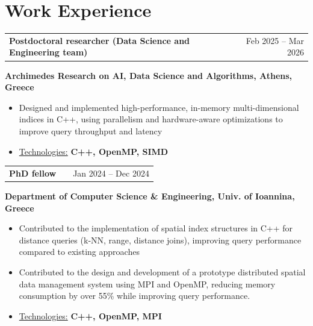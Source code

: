 \documentclass[a4paper,10pt]{article}
\makeatletter
\newenvironment{job}[2]
{
	\begin{tabularx}{\linewidth}{@{}l X r@{}}
		\small
		\textbf{#1} & \hfill &  #2 \\[3.75pt]
	\end{tabularx}
	\footnotesize
	\setlength{\parskip}{3pt} %
	\setlength{\parindent}{0pt} %
}
{
}
\makeatother
\begin{document}
\vspace{-1.2\baselineskip}
\section{Work Experience}

\begin{job} {Postdoctoral researcher (Data Science and Engineering team)}{Feb 2025 – Mar 2026}	
\textbf{Archimedes Research on AI, Data Science and Algorithms, Athens, Greece} 

\begin{itemize}

\item Designed and implemented high-performance, in-memory multi-dimensional indices in C++, using parallelism and hardware-aware optimizations to improve query throughput and latency

\item \underline{Technologies:} \textbf{C++, OpenMP, SIMD}
\end{itemize}

\end{job}


\begin{job}{PhD fellow }{Jan 2024 – Dec 2024}
	\textbf{Department of Computer Science \& Engineering, Univ. of Ioannina, Greece}
	\begin{itemize}
		
		
		
		\item Contributed to the implementation of spatial index structures in C++ for distance queries (k‑NN, range, distance joins), improving query performance compared to existing approaches
		
		
		\item Contributed to the design and development of a prototype distributed spatial data management system using MPI and OpenMP, reducing memory consumption by over 55\% while improving query performance.
		
		\item \underline{Technologies:} \textbf{C++, OpenMP, MPI}
		
	\end{itemize}
	
\end{job}
\end{document}
